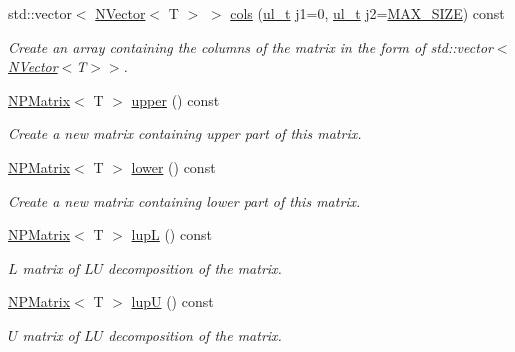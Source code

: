 \begin{Indent}
\begin{DoxyCompactItemize}
std\+::vector$<$ \mbox{\hyperlink{class_n_vector}{N\+Vector}}$<$ T $>$ $>$ \mbox{\hyperlink{class_n_p_matrix_a30c8ad7b415fa92a23375cbad3ee8e37}{cols}} (\mbox{\hyperlink{group___n_algebra_ga1b140a2034db3f5dfe18a987745df43a}{ul\+\_\+t}} j1=0, \mbox{\hyperlink{group___n_algebra_ga1b140a2034db3f5dfe18a987745df43a}{ul\+\_\+t}} j2=\mbox{\hyperlink{_n_vector_8h_a0592dba56693fad79136250c11e5a7fe}{M\+A\+X\+\_\+\+S\+I\+ZE}}) const
\begin{DoxyCompactList}\small\item\em Create an array containing the columns of the matrix in the form of {\ttfamily std\+::vector$<$\mbox{\hyperlink{class_n_vector}{N\+Vector}}$<$T$>$$>$}. \end{DoxyCompactList}\item 
\mbox{\hyperlink{class_n_p_matrix}{N\+P\+Matrix}}$<$ T $>$ \mbox{\hyperlink{class_n_p_matrix_a986376cd2765f1864fdac8b264f454ef}{upper}} () const
\begin{DoxyCompactList}\small\item\em Create a new matrix containing upper part of this matrix. \end{DoxyCompactList}\item 
\mbox{\hyperlink{class_n_p_matrix}{N\+P\+Matrix}}$<$ T $>$ \mbox{\hyperlink{class_n_p_matrix_a4618b342917acf71c13a89afc2189eaf}{lower}} () const
\begin{DoxyCompactList}\small\item\em Create a new matrix containing lower part of this matrix. \end{DoxyCompactList}\item 
\mbox{\hyperlink{class_n_p_matrix}{N\+P\+Matrix}}$<$ T $>$ \mbox{\hyperlink{class_n_p_matrix_a21088a7eef02d4d0a0781f616037097a}{lupL}} () const
\begin{DoxyCompactList}\small\item\em $ L $ matrix of $ LU $ decomposition of the matrix. \end{DoxyCompactList}\item 
\mbox{\hyperlink{class_n_p_matrix}{N\+P\+Matrix}}$<$ T $>$ \mbox{\hyperlink{class_n_p_matrix_a8da21c409841e612b72232d1159eec21}{lupU}} () const
\begin{DoxyCompactList}\small\item\em $ U $ matrix of $ LU $ decomposition of the matrix. \end{DoxyCompactList}\end{DoxyCompactItemize}
\end{Indent}
